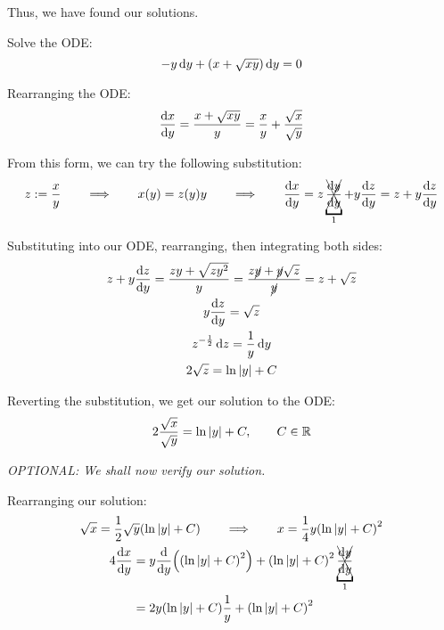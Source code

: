 \documentclass{article}
\begin{document}
Thus, we have found our solutions.



\newpage

\begin{QuestionFrame}
    Solve the ODE:
    \begin{equation*}
        -y \,\diff{y} + \parens*{x + \sqrt{xy}} \,\diff{y} = 0
    \end{equation*}
\end{QuestionFrame}

Rearranging the ODE:
\begin{equation*}
    \frac{\mathrm{d}x}{\mathrm{d}y} = \frac{x + \sqrt{xy}}{y} = \frac{x}{y} + \frac{\sqrt{x}}{\sqrt{y}}
\end{equation*}

From this form, we can try the following substitution:
\begin{equation*}
    z := \frac{x}{y}
    \qquad \Longrightarrow \qquad
    x(y) = z(y) y
    \qquad \Longrightarrow \qquad
    \frac{\diff{x}}{\diff{y}} = z \xcancelto{1}{\frac{\diff{y}}{\diff{y}}} + y \frac{\diff{z}}{\diff{y}} = z + y \frac{\diff{z}}{\diff{y}}
\end{equation*}

Substituting into our ODE, rearranging, then integrating both sides:
\begin{gather*}
    z + y \frac{\diff{z}}{\diff{y}} = \frac{zy + \sqrt{z y^2}}{y} = \frac{z \cancel{y} + \cancel{y} \sqrt{z}}{\cancel{y}} = z + \sqrt{z} \\
    y \frac{\diff{z}}{\diff{y}} = \sqrt{z} \\
    z^{-\frac{1}{2}} \,\diff{z} = \frac{1}{y} \,\diff{y} \\
    2 \sqrt{z} = \ln{\abs*{y}} + C
\end{gather*}

Reverting the substitution, we get our solution to the ODE:
\begin{equation*}
    2 \frac{\sqrt{x}}{\sqrt{y}} = \ln{\abs*{y}} + C, \qquad C \in \mathbb{R}
\end{equation*}

\bigskip

\textit{OPTIONAL: We shall now verify our solution.}

Rearranging our solution:
\begin{gather*}
    \sqrt{x} = \frac{1}{2} \sqrt{y} \parens*{\ln{\abs*{y}} + C}
    \qquad \Longrightarrow \qquad
    x = \frac{1}{4} y \parens*{\ln{\abs*{y}} + C}^2
    \\
    \begin{aligned}
        4 \frac{\diff{x}}{\diff{y}}
            &= y \frac{\diff{}}{\diff{y}}\parens*{\parens*{\ln{\abs*{y}} + C}^2} + \parens*{\ln{\abs*{y}} + C}^2 \xcancelto{1}{\frac{\diff{y}}{\diff{y}}} \\
            &= 2 y \parens*{\ln{\abs*{y}} + C} \frac{1}{y} + \parens*{\ln{\abs*{y}} + C}^2
    \end{aligned}
\end{gather*}
\end{document}
